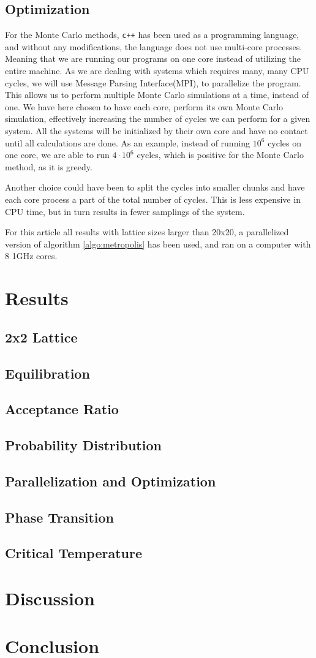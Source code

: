 \documentclass[%
reprint,
nofootinbib,
amsmath,amssymb,
aps,
]{revtex4-1}
\begin{document}
\subsection{Optimization}%
For the Monte Carlo methods, \texttt{c++} has been used as a programming language, and without any modifications, the language does not use multi-core processes. Meaning that we are running our programs on one core instead of utilizing the entire machine. As we are dealing with systems which requires many, many CPU cycles, we will use Message Parsing Interface(MPI), to parallelize the program. This allows us to perform multiple Monte Carlo simulations at a time, instead of one. We have here chosen to have each core, perform its own Monte Carlo simulation, effectively increasing the number of cycles we can perform for a given system. All the systems will be initialized by their own core and have no contact until all calculations are done. As an example, instead of running $10^6$ cycles on one core, we are able to run $4\cdot 10^6$ cycles, which is positive for the Monte Carlo method, as it is greedy. 

Another choice could have been to split the cycles into smaller chunks and have each core process a part of the total number of cycles. This is less expensive in CPU time, but in turn results in fewer samplings of the system.  

For this article all results with lattice sizes larger than 20x20, a parallelized version of algorithm \ref{algo:metropolis} has been used, and ran on a computer with 8 1GHz cores. 
\section{Results}%
\subsection{2x2 Lattice} %
\subsection{Equilibration} %
\subsection{Acceptance Ratio} %
\subsection{Probability Distribution} %
\subsection{Parallelization and Optimization} %
\subsection{Phase Transition} %
\subsection{Critical Temperature} %
\section{Discussion} %

\section{Conclusion} %



\end{document}
